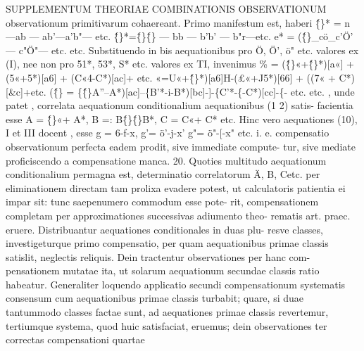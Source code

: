 \documentclass[12pt,a4paper]{article}
\begin{document}
 SUPPLEMENTUM THEORIAE COMBINATIONIS OBSERVATIONUM
observationum primitivarum cohaereant. Primo manifestum est, haberi
\^\{\}* = n ---ab --- ab'---a'b"--- etc.
\^\{\}*=\^\{\}\^\{\} --- bb --- b'b' --- b"r---etc.
e* = (\^\{\}\_cö\_c'Ö' --- c"Ö"--- etc.
etc. Substituendo in bis aequationibus pro Ö, Ö', ö" etc. valores ex (I), nee non
pro 51*, 53*, S* etc. valores ex TI, invenimus
\% = (\^\{\}«+\^\{\}*)[a«] + (5«+5*)[a6] + (C«4-C*)[ac]+ etc.
«=U«+\^\{\}*)[a6]H-(£«+J5*)[66] + ((7« + C*)[\&c]+etc.
(\^\{\} = \{\^\{\}A''--A*)[ac]--\{B'*-i-B*)[bc]-]-\{C'*-\{-C*)[cc]-\{- etc.
etc. , unde patet , correlata aequationum conditionalium aequationibus (1 2) satis-
facientia esse
A = \^\{\}«+ A*, B =: B\^\{\}\^\{\}B*, C = C«+ C* etc.
Hinc vero aequationes (10), I et III docent , esse
g = 6-f-x, g'= ö'-j-x' g"= ö"-[-x" etc.
i. e. compensatio observationum perfecta eadem prodit, sive immediate compute-
tur, sive mediate proficiscendo a compensatione manca.
20.
Quoties multitudo aequationum conditionalium permagna est, determinatio
correlatorum Ä, B, Cetc. per eliminationem directam tam prolixa evadere potest,
ut calculatoris patientia ei impar sit: tunc saepenumero commodum esse pote-
rit, compensationem completam per approximationes successivas adiumento theo-
rematis art. praec. eruere. Distribuantur aequationes conditionales in duas plu-
resve classes, investigeturque primo compensatio, per quam aequationibus primae
classis satislit, neglectis reliquis. Dein tractentur observationes per hanc com-
pensationem mutatae ita, ut solarum aequationum secundae classis ratio habeatur.
Generaliter loquendo applicatio secundi compensationum systematis consensum
cum aequationibus primae classis turbabit; quare, si duae tantummodo classes
factae sunt, ad aequationes primae classis revertemur, tertiumque systema, quod
huic satisfaciat, eruemus; dein observationes ter correctas compensationi quartae
\end{document}
